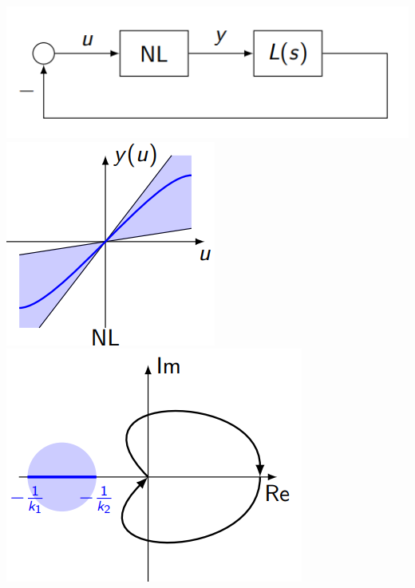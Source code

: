 \includegraphics[width = \linewidth]{src/images/nolinearity_block_diagram.png}
\includegraphics[width = \linewidth]{src/images/nolinearity_plot.png}
\includegraphics[width = \linewidth]{src/images/nolinearity_nyquist.png}

